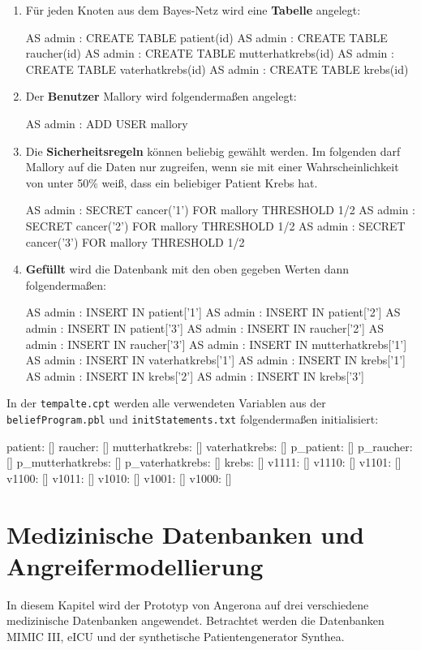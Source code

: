 \documentclass[german,version-2020-11]{uzl-thesis}
\begin{document}
\begin{enumerate}
	\item  Für jeden Knoten aus dem Bayes-Netz wird eine \textbf{Tabelle} angelegt: 
\begin{Pseudocode}
AS admin : CREATE TABLE patient(id)
AS admin : CREATE TABLE raucher(id)
AS admin : CREATE TABLE mutterhatkrebs(id)
AS admin : CREATE TABLE vaterhatkrebs(id)
AS admin : CREATE TABLE krebs(id)
\end{Pseudocode}
\item Der \textbf{Benutzer} Mallory wird folgendermaßen angelegt:
\begin{Pseudocode}
AS admin : ADD USER mallory
\end{Pseudocode}
\item Die \textbf{Sicherheitsregeln} können beliebig gewählt werden. Im folgenden darf Mallory auf die Daten nur zugreifen, wenn sie mit einer Wahrscheinlichkeit von unter 50\% weiß, dass ein beliebiger Patient Krebs hat.
\begin{Pseudocode}
AS admin : SECRET cancer('1') FOR mallory THRESHOLD 1/2
AS admin : SECRET cancer('2') FOR mallory THRESHOLD 1/2
AS admin : SECRET cancer('3') FOR mallory THRESHOLD 1/2
\end{Pseudocode}
\item \textbf{Gefüllt} wird die Datenbank mit den oben gegeben Werten dann folgendermaßen:
\begin{Pseudocode}
AS admin : INSERT IN patient['1']
AS admin : INSERT IN patient['2']
AS admin : INSERT IN patient['3']
AS admin : INSERT IN raucher['2']
AS admin : INSERT IN raucher['3']
AS admin : INSERT IN mutterhatkrebs['1']
AS admin : INSERT IN vaterhatkrebs['1']
AS admin : INSERT IN krebs['1']
AS admin : INSERT IN krebs['2']
AS admin : INSERT IN krebs['3']
\end{Pseudocode}
\end{enumerate}
In der  \texttt{tempalte.cpt} werden alle verwendeten Variablen aus der \texttt{beliefProgram.pbl} und \texttt{initStatements.txt} folgendermaßen initialisiert: 
\begin{Pseudocode}
patient: []
raucher: []
mutterhatkrebs: []
vaterhatkrebs: []
p_patient: []
p_raucher: []
p_mutterhatkrebs: []
p_vaterhatkrebs: []
krebs: []
v1111: []
v1110: []
v1101: []
v1100: []
v1011: []
v1010: []
v1001: []
v1000: []
\end{Pseudocode}

\chapter{Medizinische Datenbanken und Angreifermodellierung}\label{chap:Modellierung}
In diesem Kapitel wird der Prototyp von Angerona auf drei verschiedene medizinische Datenbanken angewendet. Betrachtet werden die Datenbanken MIMIC III, eICU und der synthetische Patientengenerator Synthea.
\end{document}
